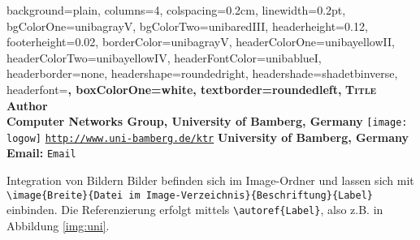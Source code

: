 \documentclass[a0paper,
landscape,
fontscale=0.332,
debug,
hyperref={pdfpagelabels=false}]{baposter}
\begin{document}
\begin{poster}{
  background=plain,%
  columns=4,
  colspacing=0.2cm,
  linewidth=0.2pt,
  bgColorOne=unibagrayV,
  bgColorTwo=unibaredIII,
  headerheight=0.12\textheight,
  footerheight=0.02\textheight,
  borderColor=unibagrayV,
  headerColorOne=unibayellowII,
  headerColorTwo=unibayellowIV,
  headerFontColor=unibablueI,
  headerborder=none,
  headershape=roundedright,
  headershade=shadetbinverse,%
  headerfont=\large\bf,
  boxColorOne=white,
  textborder=roundedleft,
}
{}
 {\Huge\textcolor{unibayellowI}{\textbf{\textsc{Title}}}\normalsize}
 {\LARGE\textcolor{unibagrayV}{\textbf{Author}}\normalsize\\[.5em]
 {\Large\textcolor{unibagrayIV}{\textbf{Computer Networks Group, University of Bamberg, Germany}}\normalsize}}
{\texttt{[image: logow]}}
{\textcolor{unibablueI}{\texttt{\url{http://www.uni-bamberg.de/ktr}}}}
{\textcolor{unibablueI}{\textbf{University of Bamberg, Germany}}}
{\textcolor{unibablueI}{\textbf{Email:} \texttt{Email}}}


\begin{posterbox}[column=0, name=posterboxOne, height=auto]{Integration von Bildern}
Bilder befinden sich im Image-Ordner und lassen sich mit \lstinline|\image{Breite}{Datei im Image-Verzeichnis}{Beschriftung}{Label}| einbinden.
Die Referenzierung erfolgt mittels \lstinline|\autoref{Label}|, also z.B. in Abbildung \ref{img:uni}.
\end{posterbox}


\end{poster}
\end{document}
